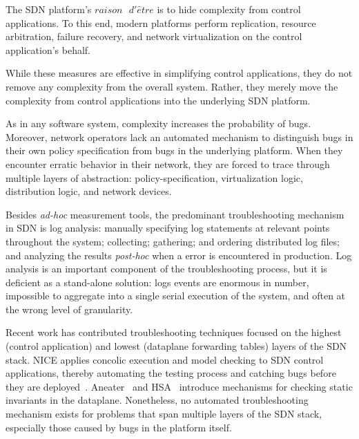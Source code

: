 The SDN platform's $raison\text{ }d'\hat{e}tre$ is to 
hide complexity from control applications. To this end, modern platforms perform
replication, resource arbitration, failure recovery, and network 
virtualization on the control application's behalf. 

While these measures are effective in simplifying control applications,
they do not remove any complexity from the overall system. Rather, they merely move the complexity
from control applications into the underlying SDN platform.

As in any software system, complexity increases the probability of
bugs. Moreover, network operators lack an automated mechanism to
distinguish bugs in their own policy specification from bugs in the underlying
platform. When they encounter erratic behavior in their network,
they are forced to trace through
multiple layers of abstraction: policy-specification, virtualization logic, distribution logic, and
network devices.

Besides {\it ad-hoc} measurement tools,
the predominant troubleshooting mechanism in SDN is
log analysis: manually specifying log statements at relevant points throughout the system;
collecting; gathering; and ordering distributed log files; and analyzing the
results {\it post-hoc} when a error is encountered in production. Log analysis
is an important component of the troubleshooting process, but it is deficient
as a stand-alone solution: logs events
are enormous in number, impossible to aggregate into a single serial
execution of the system, and often at the wrong level of granularity.

Recent work has contributed troubleshooting techniques focused on the highest (control
application) and lowest (dataplane forwarding tables) layers of the SDN stack.
NICE applies concolic execution and model checking to SDN control
applications, thereby automating the testing process and catching bugs before
they are deployed~\cite{nice}. Aneater~\cite{anteater} and HSA~\cite{hsa}
introduce mechanisms for checking static invariants in the dataplane.
Nonetheless, no automated troubleshooting mechanism exists for problems that span
multiple layers of the SDN stack, especially those caused by bugs in the platform
itself.


